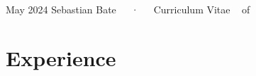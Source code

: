 \documentclass[11pt,a4paper,]{awesome-cv}
\begin{document}
\makecvheader

\makecvfooter
  {May 2024}
    {Sebastian Bate~~~·~~~Curriculum Vitae}
  {\thepage~ of \pageref{LastPage}~}





\hypertarget{experience}{%
\section{Experience}\label{experience}}
\end{document}
